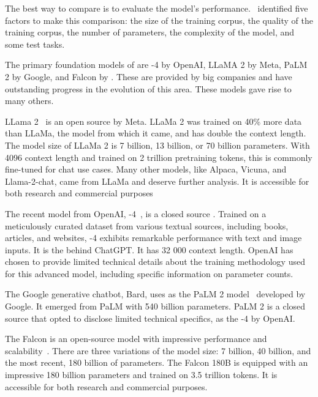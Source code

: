 The best way to compare {\llm} is to evaluate the model's performance.~\citet{hadi_LLM_2023} identified five factors to make this comparison: the size of the training corpus, the quality of the training corpus, the number of parameters, the complexity of the model, and some test tasks.

The primary foundation models of {\llm} are {\gpt}-4 by OpenAI, LLaMA 2 by Meta, PaLM 2 by Google, and Falcon by {\tii}. These {\llm} are provided by big companies and have outstanding progress in the evolution of this area. These models gave rise to many others.

LLama 2~\cite{touvron_llama_2023} is an open source {\llm} by Meta. LLaMa 2 was trained on 40\% more data than LLaMa, the model from which it came, and has double the context length. The model size of LLaMa 2 is 7 billion, 13 billion, or 70 billion parameters. With 4096 context length and trained on 2 trillion pretraining tokens, this {\llm} is commonly fine-tuned for chat use cases. Many other models, like Alpaca, Vicuna, and Llama-2-chat, came from LLaMa and deserve further analysis. It is accessible for both research and commercial purposes

The recent {\gpt} model from OpenAI, {\gpt}-4~\cite{openai_gpt-4_2023}, is a closed source {\llm}. Trained on a meticulously curated dataset from various textual sources, including books, articles, and websites, {\gpt}-4 exhibits remarkable performance with text and image inputs. It is the {\llm} behind ChatGPT. It has 32 000 context length. OpenAI has chosen to provide limited technical details about the training methodology used for this advanced model, including specific information on parameter counts.

The Google generative chatbot, Bard, uses as {\llm} the PaLM 2 model~\cite{anil_palm_2023} developed by Google. It emerged from PaLM with 540 billion parameters. PaLM 2 is a closed source {\llm} that opted to disclose limited technical specifics, as the {\gpt}-4 by OpenAI. 

The Falcon {\llm} is an open-source model with impressive performance and scalability~\cite{almazrouei_falcon_2023}. There are three variations of the model size: 7 billion, 40 billion, and the most recent, 180 billion of parameters. The Falcon 180B is equipped with an impressive 180 billion parameters and trained on 3.5 trillion tokens. It is accessible for both research and commercial purposes.


